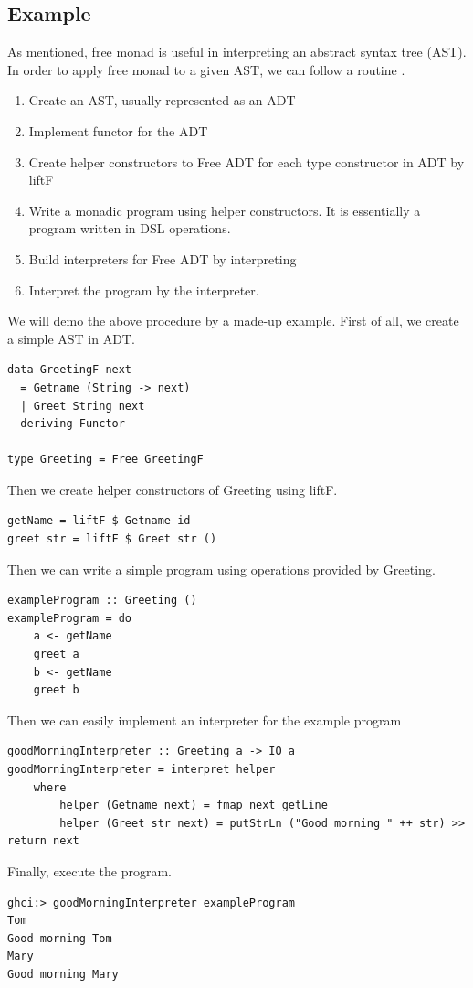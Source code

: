 \subsection{Example} \label{b:fm:e}
As mentioned, free monad is useful in interpreting an abstract syntax tree (AST). In order to apply free monad to a given AST, we can follow a routine \cite{contributorsCatsFreeMonads}.
\begin{enumerate}
  \item Create an AST, usually represented as an ADT
  \item Implement functor for the ADT
  \item Create helper constructors to Free ADT for each type constructor in ADT by liftF 
  \item Write a monadic program using helper constructors. It is essentially a program written in DSL operations.
  \item Build interpreters for Free ADT by interpreting
  \item Interpret the program by the interpreter.
\end{enumerate}
We will demo the above procedure by a made-up example. First of all, we create a simple AST in ADT. 
\begin{verbatim}
data GreetingF next
  = Getname (String -> next)
  | Greet String next
  deriving Functor

type Greeting = Free GreetingF
\end{verbatim}
Then we create helper constructors of Greeting using liftF.
\begin{verbatim}
getName = liftF $ Getname id
greet str = liftF $ Greet str ()
\end{verbatim}
Then we can write a simple program using operations provided by Greeting.
\begin{verbatim}
exampleProgram :: Greeting ()
exampleProgram = do
    a <- getName
    greet a
    b <- getName
    greet b
\end{verbatim}
Then we can easily implement an interpreter for the example program
\begin{verbatim}
goodMorningInterpreter :: Greeting a -> IO a
goodMorningInterpreter = interpret helper
    where
        helper (Getname next) = fmap next getLine
        helper (Greet str next) = putStrLn ("Good morning " ++ str) >> return next  
\end{verbatim} 
Finally, execute the program.
\begin{verbatim}
ghci:> goodMorningInterpreter exampleProgram
Tom
Good morning Tom
Mary
Good morning Mary
\end{verbatim}

